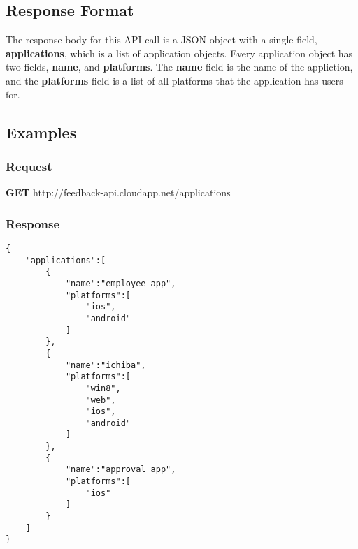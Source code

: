 
\subsection{Response Format}

The response body for this API call is a JSON object with a single field, \textbf{applications},
which is a list of application objects. Every application object has two fields, \textbf{name},
and \textbf{platforms}. The \textbf{name} field is the name of the appliction, and the
\textbf{platforms} field is a list of all platforms that the application has users for.

\vspace{3cm}


\subsection{Examples}

\subsubsection{Request}
\textbf{GET} http://feedback-api.cloudapp.net/applications

\subsubsection{Response}
\begin{verbatim}
{
    "applications":[
        {
            "name":"employee_app",
            "platforms":[
                "ios",
                "android"
            ]
        },
        {
            "name":"ichiba",
            "platforms":[
                "win8",
                "web",
                "ios",
                "android"
            ]
        },
        {
            "name":"approval_app",
            "platforms":[
                "ios"
            ]
        }
    ]
}
\end{verbatim}
